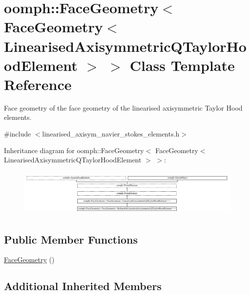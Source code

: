 \hypertarget{classoomph_1_1FaceGeometry_3_01FaceGeometry_3_01LinearisedAxisymmetricQTaylorHoodElement_01_4_01_4}{}\section{oomph\+:\+:Face\+Geometry$<$ Face\+Geometry$<$ Linearised\+Axisymmetric\+Q\+Taylor\+Hood\+Element $>$ $>$ Class Template Reference}
\label{classoomph_1_1FaceGeometry_3_01FaceGeometry_3_01LinearisedAxisymmetricQTaylorHoodElement_01_4_01_4}


Face geometry of the face geometry of the linearised axisymmetric Taylor Hood elements.  




{\ttfamily \#include $<$linearised\+\_\+axisym\+\_\+navier\+\_\+stokes\+\_\+elements.\+h$>$}

Inheritance diagram for oomph\+:\+:Face\+Geometry$<$ Face\+Geometry$<$ Linearised\+Axisymmetric\+Q\+Taylor\+Hood\+Element $>$ $>$\+:\begin{figure}[H]
\begin{center}
\leavevmode
\includegraphics[height=2.372881cm]{classoomph_1_1FaceGeometry_3_01FaceGeometry_3_01LinearisedAxisymmetricQTaylorHoodElement_01_4_01_4}
\end{center}
\end{figure}
\subsection*{Public Member Functions}
\begin{DoxyCompactItemize}
\item 
\hyperlink{classoomph_1_1FaceGeometry_3_01FaceGeometry_3_01LinearisedAxisymmetricQTaylorHoodElement_01_4_01_4_a32effe2e7186dc9f004ad29add157dd0}{Face\+Geometry} ()
\end{DoxyCompactItemize}
\subsection*{Additional Inherited Members}


